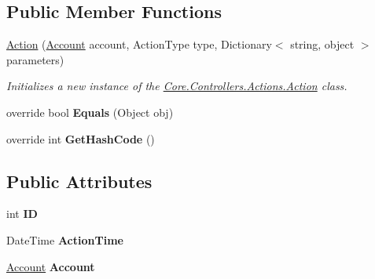 \subsection*{Public Member Functions}
\begin{DoxyCompactItemize}
\item 
\hyperlink{classCore_1_1Models_1_1Action_a9d3ae6b3d8edb503dae829e959d612d3}{Action} (\hyperlink{classCore_1_1Models_1_1Account}{Account} account, Action\-Type type, Dictionary$<$ string, object $>$ parameters)
\begin{DoxyCompactList}\small\item\em Initializes a new instance of the \hyperlink{classCore_1_1Controllers_1_1Actions_1_1Action}{Core.\-Controllers.\-Actions.\-Action} class. \end{DoxyCompactList}\item 
\hypertarget{classCore_1_1Models_1_1Action_aa56eb16abbf969a7671372f309439440}{override bool {\bfseries Equals} (Object obj)}\label{classCore_1_1Models_1_1Action_aa56eb16abbf969a7671372f309439440}

\item 
\hypertarget{classCore_1_1Models_1_1Action_a29fa0c569250878b3f04d174cf5677ac}{override int {\bfseries Get\-Hash\-Code} ()}\label{classCore_1_1Models_1_1Action_a29fa0c569250878b3f04d174cf5677ac}

\end{DoxyCompactItemize}
\subsection*{Public Attributes}
\begin{DoxyCompactItemize}
\item 
\hypertarget{classCore_1_1Models_1_1Action_a13671e1a48f3a462a366fe2768073816}{int {\bfseries I\-D}}\label{classCore_1_1Models_1_1Action_a13671e1a48f3a462a366fe2768073816}

\item 
\hypertarget{classCore_1_1Models_1_1Action_ab973fe9b8e3c6a60fa9d82cf53de57c3}{Date\-Time {\bfseries Action\-Time}}\label{classCore_1_1Models_1_1Action_ab973fe9b8e3c6a60fa9d82cf53de57c3}

\item 
\hypertarget{classCore_1_1Models_1_1Action_a1924816082b3d1173ef309581a69ef95}{\hyperlink{classCore_1_1Models_1_1Account}{Account} {\bfseries Account}}\label{classCore_1_1Models_1_1Action_a1924816082b3d1173ef309581a69ef95}

\end{DoxyCompactItemize}
